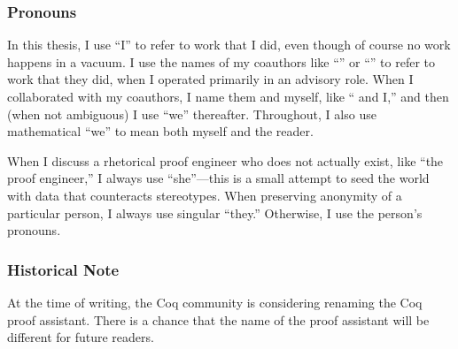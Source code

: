 \subsubsection*{Pronouns}

In this thesis, I use ``I'' to refer to work that I did,
even though of course no work happens in a vacuum.
I use the names of my coauthors like ``'' or ``'' to refer to work that they did,
when I operated primarily in an advisory role.
When I collaborated with my coauthors, I name them and myself, like `` and I,''
and then (when not ambiguous) I use ``we'' thereafter.
Throughout, I also use mathematical ``we'' to mean both myself and the reader.

When I discuss a rhetorical proof engineer who does not actually exist,
like ``the proof engineer,'' I always use ``she''---this is a small attempt
to seed the world with data that counteracts stereotypes. 
When preserving anonymity of a particular person, I always use singular ``they.''
Otherwise, I use the person's pronouns.

\subsubsection*{Historical Note}

At the time of writing, the Coq community is considering renaming the Coq proof assistant.
There is a chance that the name of the proof assistant will be different for future readers.



